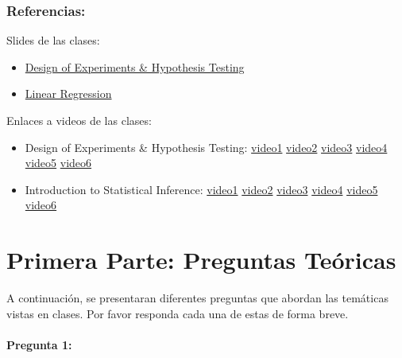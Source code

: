 \documentclass[]{article}
\providecommand{\tightlist}{%
  \setlength{\itemsep}{0pt}\setlength{\parskip}{0pt}}
\let\oldparagraph\paragraph
\renewcommand{\paragraph}[1]{\oldparagraph{#1}\mbox{}}
\begin{document}
\hypertarget{referencias}{%
\subsubsection{\texorpdfstring{\textbf{Referencias:}}{Referencias:}}\label{referencias}}

Slides de las clases:

\begin{itemize}
\tightlist
\item
  \href{https://github.com/dccuchile/CC6104/blob/master/slides/ST-hypothesis.pdf}{Design
  of Experiments \& Hypothesis Testing}
\item
  \href{https://github.com/dccuchile/CC6104/blob/master/slides/ST-regression.pdf}{Linear
  Regression}
\end{itemize}

Enlaces a videos de las clases:

\begin{itemize}
\tightlist
\item
  Design of Experiments \& Hypothesis Testing:
  \href{https://youtu.be/3MueyHnNNig}{video1}
  \href{https://youtu.be/JuyIrya23E0}{video2}
  \href{https://youtu.be/OXTyG6DIvK4}{video3}
  \href{https://youtu.be/95QeSwrNoLI}{video4}
  \href{https://youtu.be/ZCr3WCdc-54}{video5}
  \href{https://youtu.be/T6ZR0KoKhBQ}{video6}
\item
  Introduction to Statistical Inference:
  \href{https://youtu.be/ZLZXJPKH6tU}{video1}
  \href{https://youtu.be/mW7bHkJBcB4}{video2}
  \href{https://youtu.be/SHa5Neb7bfg}{video3}
  \href{https://youtu.be/rCD_jofxecY}{video4}
  \href{https://youtu.be/ir4P_f3s44g}{video5}
  \href{https://youtu.be/wfNhJWHPOi8}{video6}
\end{itemize}

\hypertarget{primera-parte-preguntas-teoricas}{%
\section{Primera Parte: Preguntas
Teóricas}\label{primera-parte-preguntas-teoricas}}

A continuación, se presentaran diferentes preguntas que abordan las
temáticas vistas en clases. Por favor responda cada una de estas de
forma breve.

\hypertarget{pregunta-1}{%
\paragraph{\texorpdfstring{\textbf{Pregunta
1:}}{Pregunta 1:}}\label{pregunta-1}}
\end{document}
